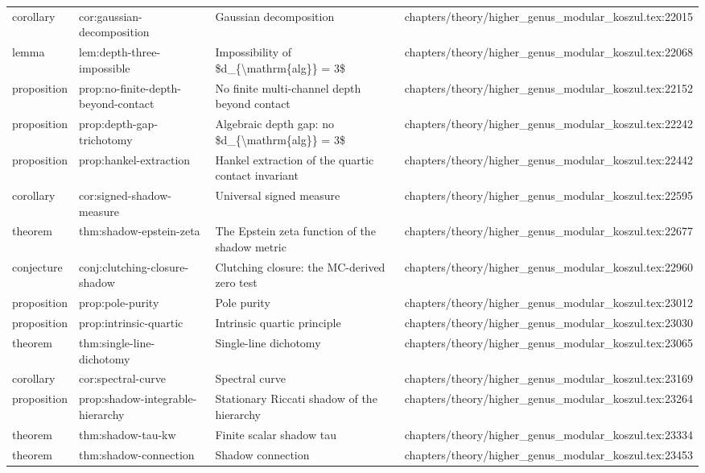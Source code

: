 \documentclass[11pt]{article}
\begin{document}
\begin{longtable}{L{0.10\textwidth}L{0.26\textwidth}L{0.42\textwidth}L{0.22\textwidth}}
corollary & cor:gaussian-decomposition & Gaussian decomposition & chapters/theory/higher\_genus\_modular\_koszul.tex:22015\\
lemma & lem:depth-three-impossible & Impossibility of \$d\_\{\textbackslash{}mathrm\{alg\}\} = 3\$ & chapters/theory/higher\_genus\_modular\_koszul.tex:22068\\
proposition & prop:no-finite-depth-beyond-contact & No finite multi-channel depth beyond contact & chapters/theory/higher\_genus\_modular\_koszul.tex:22152\\
proposition & prop:depth-gap-trichotomy & Algebraic depth gap: no \$d\_\{\textbackslash{}mathrm\{alg\}\} = 3\$ & chapters/theory/higher\_genus\_modular\_koszul.tex:22242\\
proposition & prop:hankel-extraction & Hankel extraction of the quartic contact invariant & chapters/theory/higher\_genus\_modular\_koszul.tex:22442\\
corollary & cor:signed-shadow-measure & Universal signed measure & chapters/theory/higher\_genus\_modular\_koszul.tex:22595\\
theorem & thm:shadow-epstein-zeta & The Epstein zeta function of the shadow metric & chapters/theory/higher\_genus\_modular\_koszul.tex:22677\\
conjecture & conj:clutching-closure-shadow & Clutching closure: the MC-derived zero test & chapters/theory/higher\_genus\_modular\_koszul.tex:22960\\
proposition & prop:pole-purity & Pole purity & chapters/theory/higher\_genus\_modular\_koszul.tex:23012\\
proposition & prop:intrinsic-quartic & Intrinsic quartic principle & chapters/theory/higher\_genus\_modular\_koszul.tex:23030\\
theorem & thm:single-line-dichotomy & Single-line dichotomy & chapters/theory/higher\_genus\_modular\_koszul.tex:23065\\
corollary & cor:spectral-curve & Spectral curve & chapters/theory/higher\_genus\_modular\_koszul.tex:23169\\
proposition & prop:shadow-integrable-hierarchy & Stationary Riccati shadow of the hierarchy & chapters/theory/higher\_genus\_modular\_koszul.tex:23264\\
theorem & thm:shadow-tau-kw & Finite scalar shadow tau & chapters/theory/higher\_genus\_modular\_koszul.tex:23334\\
theorem & thm:shadow-connection & Shadow connection & chapters/theory/higher\_genus\_modular\_koszul.tex:23453\\

\end{longtable}
\end{document}
